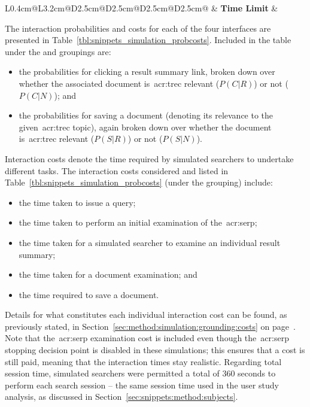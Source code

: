\begin{table}[t!]
\begin{center}
\begin{tabulary}{\textwidth}{L{0.4cm}@{\CS}L{3.2cm}@{\CS}D{2.5cm}@{\CS}D{2.5cm}@{\CS}D{2.5cm}@{\CS}D{2.5cm}@{\CS}}
        \RS\RS\RS & \lbluecell\textbf{Time Limit} & \\
        
    \end{tabulary}
    \end{center}
\end{table}

The interaction probabilities and costs for each of the four interfaces are presented in Table~\ref{tbl:snippets_simulation_probcosts}. Included in the table under the  and  groupings are:

\begin{itemize}
    \item{the probabilities for clicking a result summary link, broken down over whether the associated document is~\gls{acr:trec} relevant ($P(C|R)$) or not ($P(C|N)$); and}
    \item{the probabilities for saving a document (denoting its relevance to the given~\gls{acr:trec} topic), again broken down over whether the document is~\gls{acr:trec} relevant ($P(S|R)$) or not ($P(S|N)$).}
\end{itemize}

Interaction costs denote the time required by simulated searchers to undertake different tasks. The interaction costs considered and listed in Table~\ref{tbl:snippets_simulation_probcosts} (under the  grouping) include:

\begin{itemize}
    \item{the time taken to issue a query;}
    \item{the time taken to perform an initial examination of the~\gls{acr:serp};}
    \item{the time taken for a simulated searcher to examine an individual result summary;}
    \item{the time taken for a document examination; and}
    \item{the time required to save a document.}
\end{itemize}

Details for what constitutes each individual interaction cost can be found, as previously stated, in Section~\ref{sec:method:simulation:grounding:costs} on page~\pageref{sec:method:simulation:grounding:costs}. Note that the~\gls{acr:serp} examination cost is included even though the~\gls{acr:serp} stopping decision point is disabled in these simulations; this ensures that a cost is still paid, meaning that the interaction times stay realistic. Regarding total session time, simulated searchers were permitted a total of $360$ seconds to perform each search session -- the same session time used in the user study analysis, as discussed in Section~\ref{sec:snippets:method:subjects}.

